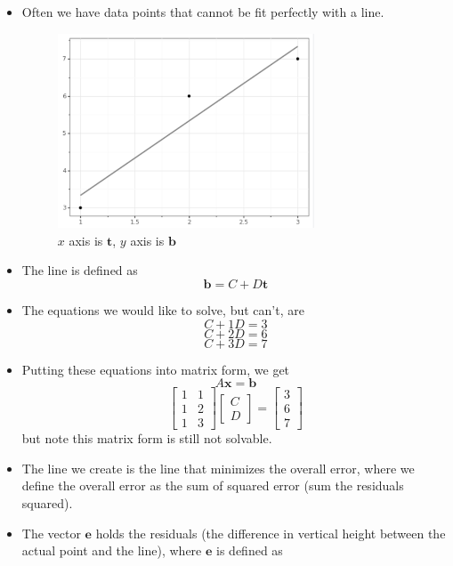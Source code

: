 \documentclass[11pt]{article}
\begin{document}
\textbf{}
\begin{itemize}
    \item Often we have data points that cannot be fit perfectly with a line.
    \begin{figure}[H] 
        \centering 
        \includegraphics[width=3in]{imgs/ols_simple.png}
        \caption{$x$ axis is $\boldsymbol{t}$, $y$ axis is $\boldsymbol{b}$}
    \end{figure}
    \item The line is defined as \[\boldsymbol{b}=C+D\boldsymbol{t}\]
    \item The equations we would like to solve, but can't, are
    \[C + 1D = 3\]
    \[C + 2D = 6\]
    \[C + 3D = 7\]
    \item Putting these equations into matrix form, we get
    \[A\boldsymbol{x} = \boldsymbol{b} \]
    \[
    \begin{bmatrix}
        1 & 1 \\
        1 & 2 \\
        1 & 3
    \end{bmatrix}  
    \begin{bmatrix}
        C \\
        D 
    \end{bmatrix}  =
    \begin{bmatrix}
        3 \\
        6 \\
        7
    \end{bmatrix}  
    \]
    but note this matrix form is still not solvable.
    \item The line we create is the line that minimizes the overall error, where we 
    define the overall error as the sum of squared error (sum the residuals squared).
    \item The vector $\boldsymbol{e}$ holds the residuals (the difference in vertical height
    between the actual point and the line), where $\boldsymbol{e}$ is defined as 

\end{itemize}
\end{document}
